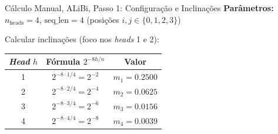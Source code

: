 \documentclass[aspectratio=169, xcolor=dvipsnames]{beamer}
\begin{document}
  \begin{frame}{Cálculo Manual, ALiBi, Passo 1: Configuração e Inclinações}
    \textbf{Parâmetros:} $n_{\text{heads}} = 4$, \; $\text{seq\_len} = 4$ \; (posições $i, j \in \{0,1,2,3\}$)

    \vspace{0.3em}
    Calcular inclinações (foco nos \textit{heads} 1 e 2):

    \centering
    {\small
    \begin{tabular}{ccc}
      \toprule
      \textit{Head} $h$ & Fórmula $2^{-8h/n}$ & Valor \\
      \midrule
      \rowcolor{CellGreen} 1 & $2^{-8 \cdot 1/4} = 2^{-2}$ & $m_1 = 0.2500$ \\
      \rowcolor{CellGreen} 2 & $2^{-8 \cdot 2/4} = 2^{-4}$ & $m_2 = 0.0625$ \\
      3 & $2^{-8 \cdot 3/4} = 2^{-6}$ & $m_3 = 0.0156$ \\
      4 & $2^{-8 \cdot 4/4} = 2^{-8}$ & $m_4 = 0.0039$ \\
      \bottomrule
    \end{tabular}}
  \end{frame}
\end{document}
